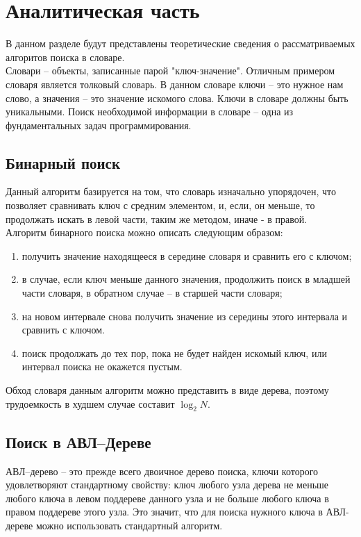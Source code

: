 \chapter{Аналитическая часть}
В данном разделе будут представлены теоретические сведения о рассматриваемых алгоритов поиска в словаре.\\

Словари – объекты, записанные парой "ключ-значение". Отличным примером словаря является толковый словарь. В данном словаре ключи – это нужное нам слово, а значения – это значение искомого слова. Ключи в словаре должны быть уникальными. Поиск необходимой информации в словаре – одна из фундаментальных задач программирования.


\section{Бинарный поиск}

Данный алгоритм базируется на том, что словарь изначально упорядочен, что позволяет сравнивать ключ с средним элементом, и, если, он меньше, то продолжать искать в левой части, таким же методом, иначе - в правой.\\

Алгоритм бинарного поиска можно описать следующим образом: 

\begin{enumerate}
	\item получить значение находящееся в середине словаря и сравнить его с ключом;
	\item в случае, если ключ меньше данного значения, продолжить поиск в младшей части словаря, в обратном случае -- в старшей части словаря;
	\item на новом интервале снова получить значение из середины этого интервала и сравнить с ключом.
	\item поиск продолжать до тех пор, пока не будет найден искомый ключ, или интервал поиска не окажется пустым.
\end{enumerate}

Обход словаря данным алгоритм можно представить в виде дерева, поэтому трудоемкость в худшем случае составит $\log_{2}{N}$.


\section{Поиск в АВЛ--Дереве}

АВЛ--дерево -- это прежде всего двоичное дерево поиска, ключи которого удовлетворяют стандартному свойству: ключ любого узла дерева не меньше любого ключа в левом поддереве данного узла и не больше любого ключа в правом поддереве этого узла. Это значит, что для поиска нужного ключа в АВЛ-дереве можно использовать стандартный алгоритм.


